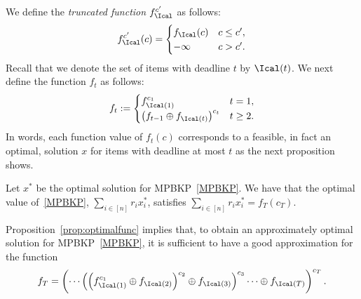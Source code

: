 \documentclass[11pt]{article}
\begin{document}
We define the \emph{truncated function} $f_\Ical^{c'}$ as follows:
\begin{align}
f_\Ical^{c'}(c) = \begin{cases}
f_\Ical(c) &  c\le c',\\
-\infty & c>c'.
\end{cases}
\end{align}
Recall that we denote the set of items with deadline $t$ by $\Ical(t)$. We next define the function $f_t$ as follows: 
\begin{align}\label{eqn:ft}
f_t := \begin{cases}
f_{\Ical(1)}^{c_1} & t=1,\\
\left(f_{t-1}\oplus f_{\Ical(t)}\right)^{c_t} & t\ge 2.
\end{cases}
\end{align}
In words, each function value of $f_t(c)$ corresponds to a feasible, in fact an optimal, solution $x$ for items with deadline at most $t$ as the next proposition shows.
\begin{proposition}\label{prop:optimalfunc}
Let $x^*$ be the optimal solution for MPBKP~\eqref{MPBKP}. We have that
the optimal value of~\eqref{MPBKP}, $\sum_{i\in[n]}r_ix_i^*$, satisfies
$
\sum_{i\in[n]}r_ix_i^*  = f_T(c_T).
$
\end{proposition}

Proposition~\ref{prop:optimalfunc} implies that, to obtain an approximately optimal solution for MPBKP~\eqref{MPBKP}, it is sufficient to have a good approximation for the function
\begin{align}
f_T = \left(\cdots\left(\left(f_{\Ical(1)}^{c_1}\oplus f_{\Ical(2)}\right)^{c_2}\oplus f_{\Ical(3)}\right)^{c_3}\cdots\oplus f_{\Ical(T)}\right)^{c_{T}}.
\end{align}
\end{document}
